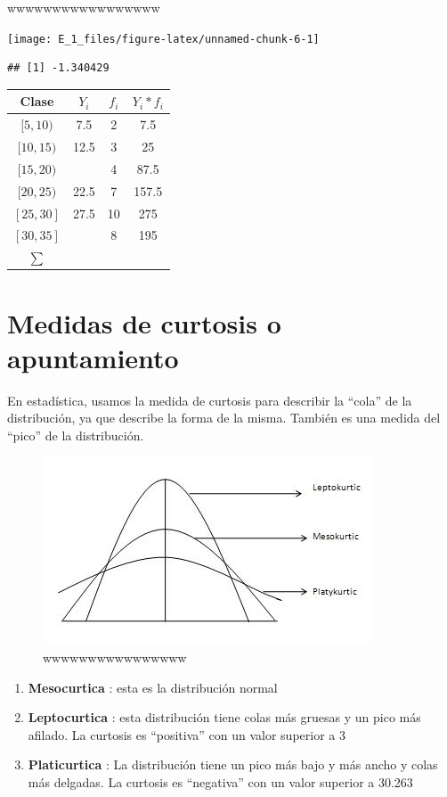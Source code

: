 \documentclass[
  11pt,
]{krantz}
\providecommand{\tightlist}{%
  \setlength{\itemsep}{0pt}\setlength{\parskip}{0pt}}
\theoremstyle{definition}
\theoremstyle{definition}
\theoremstyle{definition}
\theoremstyle{definition}
\theoremstyle{remark}
\begin{document}
wwwwwwwwwwwwwwwww

\begin{center}\texttt{[image: E\_1\_files/figure-latex/unnamed-chunk-6-1]} \end{center}

\begin{verbatim}
## [1] -1.340429
\end{verbatim}

\begin{longtable}[]{@{}cccc@{}}
\toprule
Clase & \(Y_i\) & \(f_i\) & \(Y_i*f_i\) \\
\midrule
\endhead
\([5,10)\) & 7.5 & 2 & 7.5 \\
\([10,15)\) & 12.5 & 3 & 25 \\
\([15,20)\) & & 4 & 87.5 \\
\([20,25)\) & 22.5 & 7 & 157.5 \\
\([25,30]\) & 27.5 & 10 & 275 \\
\([30,35]\) & & 8 & 195 \\
\(\sum\) & & & \\
\bottomrule
\end{longtable}

\hypertarget{medidas-de-curtosis-o-apuntamiento}{%
\chapter{Medidas de curtosis o apuntamiento}\label{medidas-de-curtosis-o-apuntamiento}}

En estadística, usamos la medida de curtosis para describir la ``cola'' de la distribución, ya que describe la forma de la misma. También es una medida del ``pico'' de la distribución.

\begin{figure}
\centering
\includegraphics{curtosis.jpg}
\caption{wwwwwwwwwwwwwwww}
\end{figure}

\begin{enumerate}
\def\labelenumi{\arabic{enumi}.}
\tightlist
\item
  \textbf{Mesocurtica} : esta es la distribución normal
\item
  \textbf{Leptocurtica} : esta distribución tiene colas más gruesas y un pico más afilado. La curtosis es ``positiva'' con un valor superior a 3
\item
  \textbf{Platicurtica} : La distribución tiene un pico más bajo y más ancho y colas más delgadas. La curtosis es ``negativa'' con un valor superior a 30.263
\end{enumerate}
\end{document}
